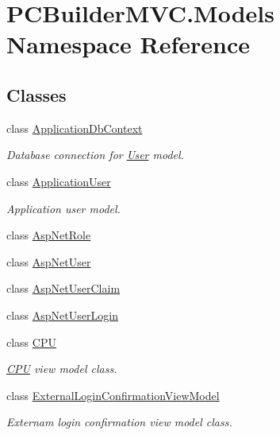 \hypertarget{namespace_p_c_builder_m_v_c_1_1_models}{}\section{P\+C\+Builder\+M\+V\+C.\+Models Namespace Reference}
\label{namespace_p_c_builder_m_v_c_1_1_models}
\subsection*{Classes}
\begin{DoxyCompactItemize}
\item 
class \hyperlink{class_p_c_builder_m_v_c_1_1_models_1_1_application_db_context}{Application\+Db\+Context}
\begin{DoxyCompactList}\small\item\em Database connection for \hyperlink{class_p_c_builder_m_v_c_1_1_models_1_1_user}{User} model. \end{DoxyCompactList}\item 
class \hyperlink{class_p_c_builder_m_v_c_1_1_models_1_1_application_user}{Application\+User}
\begin{DoxyCompactList}\small\item\em Application user model. \end{DoxyCompactList}\item 
class \hyperlink{class_p_c_builder_m_v_c_1_1_models_1_1_asp_net_role}{Asp\+Net\+Role}
\item 
class \hyperlink{class_p_c_builder_m_v_c_1_1_models_1_1_asp_net_user}{Asp\+Net\+User}
\item 
class \hyperlink{class_p_c_builder_m_v_c_1_1_models_1_1_asp_net_user_claim}{Asp\+Net\+User\+Claim}
\item 
class \hyperlink{class_p_c_builder_m_v_c_1_1_models_1_1_asp_net_user_login}{Asp\+Net\+User\+Login}
\item 
class \hyperlink{class_p_c_builder_m_v_c_1_1_models_1_1_c_p_u}{C\+PU}
\begin{DoxyCompactList}\small\item\em \hyperlink{class_p_c_builder_m_v_c_1_1_models_1_1_c_p_u}{C\+PU} view model class. \end{DoxyCompactList}\item 
class \hyperlink{class_p_c_builder_m_v_c_1_1_models_1_1_external_login_confirmation_view_model}{External\+Login\+Confirmation\+View\+Model}
\begin{DoxyCompactList}\small\item\em Externam login confirmation view model class. \end{DoxyCompactList}\item 

\end{DoxyCompactItemize}
